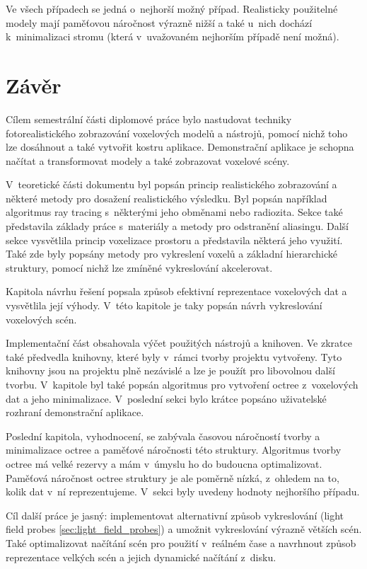 Ve všech případech se jedná o~nejhorší možný případ. Realisticky použitelné modely mají paměťovou náročnost výrazně nižší a také u~nich dochází k~minimalizaci stromu (která v~uvažovaném nejhorším případě není možná).


\chapter{Závěr}
\label{zaver}
Cílem semestrální části diplomové práce bylo nastudovat techniky fotorealistického zobrazování voxelových modelů a nástrojů, pomocí nichž toho lze dosáhnout a také vytvořit kostru aplikace. Demonstrační aplikace je schopna načítat a transformovat modely a také zobrazovat voxelové scény.

V~teoretické části dokumentu byl popsán princip realistického zobrazování a některé metody pro dosažení realistického výsledku. Byl popsán například algoritmus ray tracing s~některými jeho obměnami nebo radiozita. Sekce také představila základy práce s~materiály a metody pro odstranění aliasingu. Další sekce vysvětlila princip voxelizace prostoru a představila některá jeho využití. Také zde byly popsány metody pro vykreslení voxelů a základní hierarchické struktury, pomocí nichž lze zmíněné vykreslování akcelerovat.

Kapitola návrhu řešení popsala způsob efektivní reprezentace voxelových dat a vysvětlila její výhody. V~této kapitole je taky popsán návrh vykreslování voxelových scén.

Implementační část obsahovala výčet použitých nástrojů a knihoven. Ve zkratce také předvedla knihovny, které byly v~rámci tvorby projektu vytvořeny. Tyto knihovny jsou na projektu plně nezávislé a lze je použít pro libovolnou další tvorbu. V~kapitole byl také popsán algoritmus pro vytvoření octree z~voxelových dat a jeho minimalizace. V~poslední sekci bylo krátce popsáno uživatelské rozhraní demonstrační aplikace.

Poslední kapitola, vyhodnocení, se zabývala časovou náročností tvorby a minimalizace octree a paměťové náročnosti této struktury. Algoritmus tvorby octree má velké rezervy a mám v~úmyslu ho do budoucna optimalizovat. Paměťová náročnost octree struktury je ale poměrně nízká, z~ohledem na to, kolik dat v~ní reprezentujeme. V~sekci byly uvedeny hodnoty nejhoršího případu.

Cíl další práce je jasný: implementovat alternativní způsob vykreslování (light field probes \ref{sec:light_field_probes}) a umožnit vykreslování výrazně větších scén. Také optimalizovat načítání scén pro použití v~reálném čase a navrhnout způsob reprezentace velkých scén a jejich dynamické načítání z~disku.


